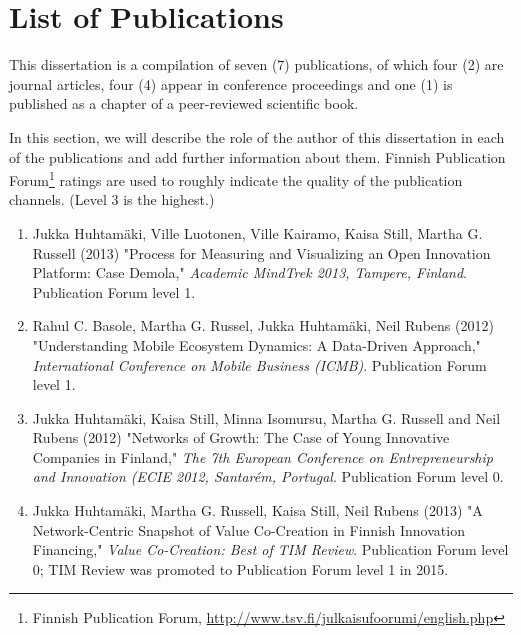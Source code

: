 \chapter{List of Publications}

\begin{midsloppypar}

This dissertation is a compilation of seven (7) publications, of which four (2) are journal articles, four (4) appear in conference proceedings and one (1) is published as a chapter of a peer-reviewed scientific book.

In this section, we will describe the role of the author of this dissertation in each of the publications and add further information about them. Finnish Publication Forum\footnote{Finnish Publication Forum, \url{http://www.tsv.fi/julkaisufoorumi/english.php}} ratings are used to roughly indicate the quality of the publication channels. (Level 3 is the highest.)

\begin{enumerate}[label=\textbf{Publication \Roman*},align=left]

  \item Jukka Huhtamäki, Ville Luotonen, Ville Kairamo, Kaisa Still, Martha G. Russell 
  (2013)
  "Process for Measuring and Visualizing an Open Innovation Platform: Case Demola,"
  \emph{Academic MindTrek 2013, Tampere, Finland}.
  Publication Forum level 1.
  \label{pub:demola}

  \item Rahul C. Basole, Martha G. Russel, Jukka Huhtamäki, Neil Rubens
  (2012)
  "Understanding Mobile Ecosystem Dynamics: A Data-Driven Approach,"
  \emph{International Conference on Mobile Business (ICMB)}.
  Publication Forum level 1.
  \label{pub:mobileecosystem}

  \item Jukka Huhtamäki, Kaisa Still, Minna Isomursu, Martha G. Russell and Neil Rubens
  (2012)
  "Networks of Growth: The Case of Young Innovative Companies in Finland," 
  \emph{The 7th European Conference on Entrepreneurship and Innovation (ECIE 2012, Santarém, Portugal}.
  Publication Forum level 0.
  \label{pub:tekesyic}

  \item Jukka Huhtamäki, Martha G. Russell, Kaisa Still, Neil Rubens
  (2013)
  "A Network-Centric Snapshot of Value Co-Creation in Finnish Innovation Financing," 
  \emph{Value Co-Creation: Best of TIM Review}.
  Publication Forum level 0; TIM Review was promoted to Publication Forum level 1 in 2015.
  \label{pub:finland}


\end{enumerate}
\end{midsloppypar}
